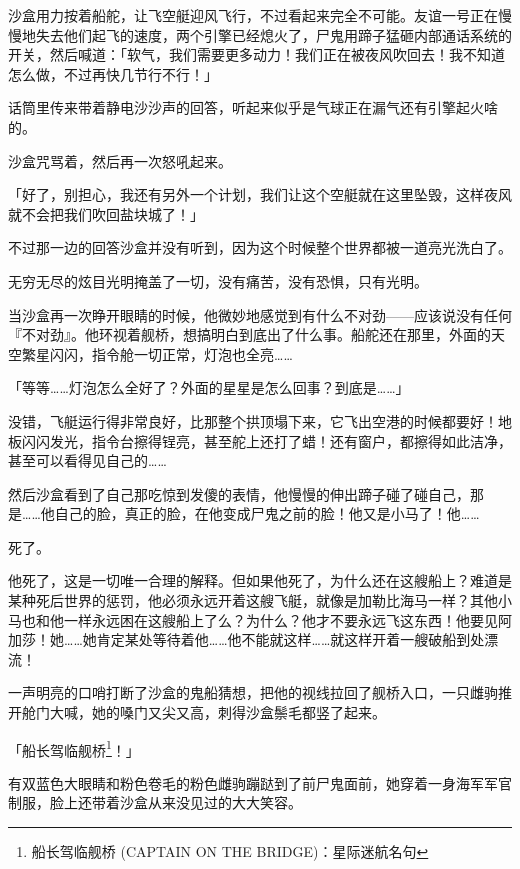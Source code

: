 \horizonline


沙盒用力按着船舵，让飞空艇迎风飞行，不过看起来完全不可能。友谊一号正在慢慢地失去他们起飞的速度，两个引擎已经熄火了，尸鬼用蹄子猛砸内部通话系统的开关，然后喊道：「软气，我们需要更多动力！我们正在被夜风吹回去！我不知道怎么做，不过再快几节行不行！」

话筒里传来带着静电沙沙声的回答，听起来似乎是气球正在漏气还有引擎起火啥的。

沙盒咒骂着，然后再一次怒吼起来。

「好了，别担心，我还有另外一个计划，我们让这个空艇就在这里坠毁，这样夜风就不会把我们吹回盐块城了！」

不过那一边的回答沙盒并没有听到，因为这个时候整个世界都被一道亮光洗白了。

无穷无尽的炫目光明掩盖了一切，没有痛苦，没有恐惧，只有光明。

\horizonline

\unknowndaytimeplace

当沙盒再一次睁开眼睛的时候，他微妙地感觉到有什么不对劲——应该说没有任何『不对劲』。他环视着舰桥，想搞明白到底出了什么事。船舵还在那里，外面的天空繁星闪闪，指令舱一切正常，灯泡也全亮……{}

「等等……灯泡怎么全好了？外面的星星是怎么回事？到底是……」

没错，飞艇运行得非常良好，比那整个拱顶塌下来，它飞出空港的时候都要好！地板闪闪发光，指令台擦得锃亮，甚至舵上还打了蜡！还有窗户，都擦得如此洁净，甚至可以看得见自己的……{}

然后沙盒看到了自己那吃惊到发傻的表情，他慢慢的伸出蹄子碰了碰自己，那是……他自己的脸，真正的脸，在他变成尸鬼之前的脸！他又是小马了！他……{}

死了。

他死了，这是一切唯一合理的解释。但如果他死了，为什么还在这艘船上？难道是某种死后世界的惩罚，他必须永远开着这艘飞艇，就像是加勒比海马一样？其他小马也和他一样永远困在这艘船上了么？为什么？他才不要永远飞这东西！他要见阿加莎！她……她肯定某处等待着他……他不能就这样……就这样开着一艘破船到处漂流！

一声明亮的口哨打断了沙盒的鬼船猜想，把他的视线拉回了舰桥入口，一只雌驹推开舱门大喊，她的嗓门又尖又高，刺得沙盒鬃毛都竖了起来。

「船长驾临舰桥\footnote{船长驾临舰桥 (CAPTAIN ON THE BRIDGE)：星际迷航名句}！」

有双蓝色大眼睛和粉色卷毛的粉色雌驹蹦跶到了前尸鬼面前，她穿着一身海军军官制服，脸上还带着沙盒从来没见过的大大笑容。

